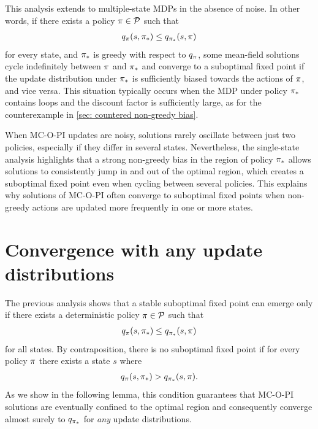 This analysis extends to multiple-state MDPs in the absence of noise. 
In other words, if there exists a policy $\pi \in \mathcal{P}$ such that
\begin{align*}
    q_{\pi}(s, {\pi}_*) \leq q_{{\pi}_*}(s, \pi)
\end{align*}
for every state,
and ${\pi}_*$ is greedy with respect to $q_\pi$, 
some mean-field solutions cycle indefinitely between $\pi$ and ${\pi}_*$ and converge to a suboptimal fixed point if the update distribution under ${\pi}_*$ is sufficiently biased towards the actions of $\pi$, and vice versa.
This situation typically occurs when the MDP under policy ${\pi}_*$ contains loops and the discount factor is sufficiently large, as for the counterexample in \autoref{sec: countered non-greedy bias}.


When MC-O-PI updates are noisy, solutions rarely oscillate between just two policies, especially if they differ in several states. Nevertheless, the single-state analysis highlights that a strong non-greedy bias in the region of policy ${\pi}_*$ allows solutions to consistently jump in and out of the optimal region, which creates a suboptimal fixed point even when cycling between several policies.
This explains why solutions of MC-O-PI often converge to suboptimal fixed points when non-greedy actions are updated more frequently in one or more states.

\vspace{-0.1cm}

\section{Convergence with any update distributions}

\vspace{-0.1cm}


The previous analysis shows that a stable suboptimal fixed point can emerge only if there exists a deterministic policy $\pi \in \mathcal{P}$ such that
\begin{align*}
    q_{\pi}(s, {\pi}_*) \leq q_{{\pi}_*}(s, \pi)
\end{align*}
for all states.
By contraposition, there is no suboptimal fixed point if for every policy $\pi$ there exists a state $s$ where
\begin{align*}
    q_{\pi}(s, {\pi}_*) > q_{{\pi}_*}(s, \pi) .
\end{align*}
As we show in the following lemma, this condition guarantees that MC-O-PI solutions are eventually confined to the optimal region and consequently converge almost surely to $q_{{\pi}_*}$ for \textit{any} update distributions.

